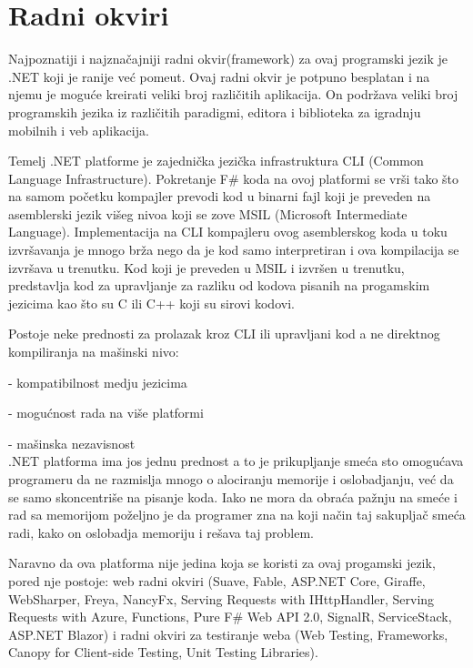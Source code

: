 \documentclass[a4paper]{article}
\begin{document}
\section{Radni okviri}

Najpoznatiji i najznačajniji radni okvir(framework) za ovaj programski jezik je .NET koji je ranije već pomeut. Ovaj radni okvir je potpuno besplatan i na njemu je moguće kreirati veliki broj različitih aplikacija. On podržava veliki broj programskih jezika iz različitih paradigmi, editora i biblioteka za igradnju mobilnih i veb aplikacija. 

Temelj .NET platforme je zajednička jezička infrastruktura CLI (Common Language Infrastructure). Pokretanje F\# koda na ovoj platformi se vrši tako što na samom početku kompajler prevodi kod u binarni fajl koji je preveden na asemblerski jezik višeg nivoa koji se zove MSIL (Microsoft Intermediate Language). Implementacija na CLI kompajleru ovog asemblerskog koda u toku izvršavanja je mnogo brža nego da je kod samo interpretiran i ova kompilacija se izvršava u trenutku\cite{progFs}.
Kod koji je preveden u MSIL i izvršen u trenutku, predstavlja kod za upravljanje za razliku od kodova pisanih na progamskim jezicima kao što su C ili C++ koji su sirovi kodovi.   

Postoje neke prednosti za prolazak kroz CLI ili upravljani kod a ne direktnog kompiliranja na mašinski nivo:	

	- kompatibilnost medju jezicima
	
	- mogućnost rada na više platformi
	
	- mašinska nezavisnost
\\

.NET platforma ima jos jednu prednost a to je prikupljanje smeća sto omogućava programeru da ne razmislja mnogo o alociranju memorije i oslobadjanju, već da se samo skoncentriše na pisanje koda. Iako ne mora da obraća pažnju na smeće i rad sa memorijom poželjno je da programer zna na koji način taj sakupljač smeća radi, kako on oslobadja memoriju i rešava taj problem.

Naravno da ova platforma nije jedina koja se koristi za ovaj progamski jezik, pored nje postoje: web radni okviri (Suave, Fable, ASP.NET Core, Giraffe, WebSharper, Freya, NancyFx, Serving Requests with IHttpHandler, Serving Requests with Azure, Functions, Pure F\# Web API 2.0, SignalR, ServiceStack, ASP.NET Blazor) i radni okviri za testiranje weba (Web Testing, Frameworks, Canopy for Client-side Testing, Unit Testing Libraries)\cite{fwFs}.
\end{document}
